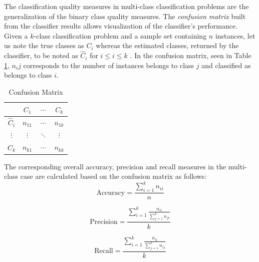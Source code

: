 \iftoggle{edit-mode}{\hspace{0pt}\marginpar{Classification quality measurements - multi-class}}{}
The classification quality measures in multi-class classification problems are the generalization of the binary class quality measures.
The \emph{confusion matrix} built from the classifier results allows visualization of the classifier's performance. 
Given a $k$-class classification problem and a sample set containing $n$ instances, let us note the true classes as $C_i$ whereas the estimated classes, returned by the classifier, to be noted as $\hat{C}_i$ for $i\leq i \leq k$ \cite{sokolova2009systematic, labatut2012accuracy}.
In the confusion matrix, seen in Table \ref{table:confusion_matrix}, $n_ij$ corresponds to the number of instances belongs to class $j$ and classified as belongs to class $i$.

\begin{table}[b]
\centering
\begin{tabular}{ c | c | c | c |}      
              & \textbf{$C_1$}    & \textbf{$\cdots$} & \textbf{$C_k$} \\ 
  \hline
  \textbf{$\hat{C}_i$} & $n_{11}$ & $\cdots$ & $n_{1k}$ \\
  \textbf{$\vdots$}    & $\vdots$ & $\ddots$ & $\vdots$ \\
  \textbf{$\hat{C}_k$} & $n_{k1}$ & $\cdots$ & $n_{kk}$ \\
  \hline
\end{tabular}
\caption{Confusion Matrix}
\label{table:confusion_matrix} 
\end{table}

The corresponding overall accuracy, precision and recall measures in the multi-class case are calculated based on the confusion matrix as follows:
\begin{equation}
\text{Accuracy}=\frac{\sum\limits_{i=1}^{k} n_{ii}}{n}
\label{eq:accuracy}
\end{equation}

\begin{equation}
\text{Precision}=\frac{\sum\limits_{i=1}^{k} \frac{n_{ii}}{\sum_{j=1}^{k} n_{ji}}}{k}
\label{eq:percision}
\end{equation}

\begin{equation}
\text{Recall}=   \frac{\sum\limits_{i=1}^{k} \frac{n_{ii}}{\sum_{j=1}^{k} n_{ij}}}{k}
\label{eq:percision}
\end{equation}

